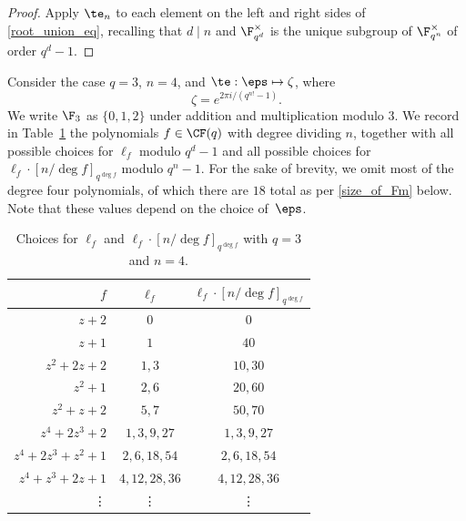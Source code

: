 \begin{proof}
Apply \(\te_n\) to each element on the left and right sides of \eqref{root_union_eq}, recalling that \(d \mid n\) and \(\F_{q^d}^\times\) is the unique subgroup of \(\F_{q^n}^\times\) of order \(q^d-1\).
\end{proof}










\begin{example}
Consider the case \(q = 3\), \(n = 4\), and \(\te : \eps \mapsto \zeta\), where
\[\zeta = e^{2 \pi i / (q^{n!}-1)}.\]
We write \(\F_3\) as \(\{0,1,2\}\) under addition and multiplication modulo \(3\).
We record in Table~\ref{root_table} the polynomials \(f \in \CF (q)\) with degree dividing \(n\), together with all possible choices for \(\ell_f\) modulo \(q^d-1\) and all possible choices for \(\ell_f \cdot [n / \deg f]_{q^{\deg f}}\) modulo \(q^n-1\).
For the sake of brevity, we omit most of the degree four polynomials, of which there are \(18\) total as per \eqref{size_of_Fm} below.
Note that these values depend on the choice of~\(\eps\).
\begin{table}[ht]
\caption{Choices for \(\ell_f\) and \(\ell_f \cdot [n/\deg f]_{q^{\deg f}}\) with \(q = 3\) and \(n = 4\).}
\centering
\begin{tabular}{r|c|c}
\(f\) & \(\ell_f\) & \(\ell_f \cdot [n/\deg f]_{q^{\deg f}}\) \\ \hline \hline
\(z + 2\) &                  \( 0 \) & \(0\) \\
\(z + 1\) &                  \( 1 \) & \(40\) \\
\hline
\(z^2 + 2z + 2\) &           \( 1, 3 \) & \( 10, 30 \) \\
\(z^2 + 1\) &                \( 2, 6 \) & \( 20, 60 \) \\
\(z^2 + z + 2\) &            \( 5, 7 \) & \( 50, 70 \) \\
\hline
\(z^4 + 2z^3 + 2\) &         \( 1,  3,  9, 27 \) & \( 1,  3,  9, 27 \) \\
\(z^4 + 2z^3 + z^2 + 1\) &   \( 2,  6, 18, 54 \) & \( 2,  6, 18, 54 \) \\
\(z^4 + z^3 + 2z + 1\) &     \( 4, 12, 28, 36 \) & \( 4, 12, 28, 36 \) \\
\vdots & \vdots & \vdots
\end{tabular}
\label{root_table}
\end{table}


\end{example}
